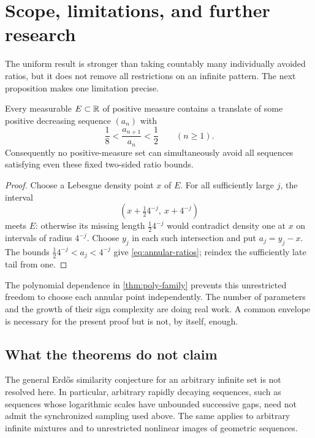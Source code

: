 \section{Scope, limitations, and further research}
\label{sec:questions}

The uniform result is stronger than taking countably many individually
avoided ratios, but it does not remove all restrictions on an infinite
pattern. The next proposition makes one limitation precise.

\begin{proposition}
\label{prop:annular-obstruction}
Every measurable $E\subset\mathbb R$ of positive measure contains a translate
of some positive decreasing sequence $(a_n)$ with
\begin{equation}\label{eq:annular-ratios}
 \frac18<\frac{a_{n+1}}{a_n}<\frac12\qquad(n\ge1).
\end{equation}
Consequently no positive-measure set can simultaneously avoid all
sequences satisfying even these fixed two-sided ratio bounds.
\end{proposition}

\begin{proof}
Choose a Lebesgue density point $x$ of $E$. For all sufficiently large
$j$, the interval
\[
 (x+\tfrac12 4^{-j},\ x+4^{-j})
\]
meets $E$: otherwise its missing length $\tfrac12 4^{-j}$ would
contradict density one at $x$ on intervals of radius $4^{-j}$.
Choose $y_j$ in each such intersection and put $a_j=y_j-x$.
The bounds $\tfrac12 4^{-j}<a_j<4^{-j}$ give
\eqref{eq:annular-ratios}; reindex the sufficiently late tail from one.
\end{proof}

The polynomial dependence in \cref{thm:poly-family} prevents this
unrestricted freedom to choose each annular point independently. The
number of parameters and the growth of their sign complexity are doing
real work. A common envelope is necessary for the present proof but is
not, by itself, enough.

\subsection{What the theorems do not claim}

The general Erd\H{o}s similarity conjecture for an arbitrary infinite
set is not resolved here. In particular, arbitrary rapidly decaying
sequences, such as sequences whose logarithmic scales have unbounded
successive gaps, need not admit the synchronized sampling used above.
The same applies to arbitrary infinite mixtures and to unrestricted
nonlinear images of geometric sequences.

